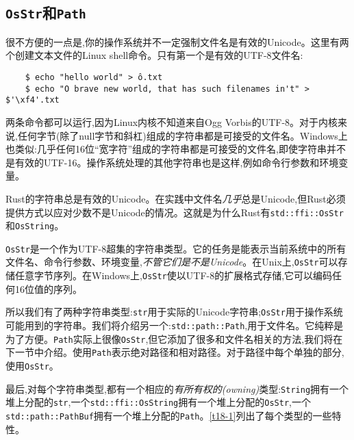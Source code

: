 \subsection{\texttt{OsStr}和\texttt{Path}}
很不方便的一点是,你的操作系统并不一定强制文件名是有效的Unicode。这里有两个创建文本文件的Linux shell命令。只有第一个是有效的UTF-8文件名:
\begin{verbatim}
    $ echo "hello world" > ô.txt
    $ echo "O brave new world, that has such filenames in't" > $'\xf4'.txt
\end{verbatim}

两条命令都可以运行,因为Linux内核不知道来自Ogg Vorbis的UTF-8。对于内核来说,任何字节(除了null字节和斜杠)组成的字符串都是可接受的文件名。Windows上也类似:几乎任何16位“宽字符”组成的字符串都是可接受的文件名,即使字符串并不是有效的UTF-16。操作系统处理的其他字符串也是这样,例如命令行参数和环境变量。

Rust的字符串总是有效的Unicode。在实践中文件名\emph{几乎}总是Unicode,但Rust必须提供方式以应对少数不是Unicode的情况。这就是为什么Rust有\texttt{std::ffi::OsStr}和\texttt{OsString}。

\texttt{OsStr}是一个作为UTF-8超集的字符串类型。它的任务是能表示当前系统中的所有文件名、命令行参数、环境变量,\emph{不管它们是不是Unicode}。在Unix上,\texttt{OsStr}可以存储任意字节序列。在Windows上,\texttt{OsStr}使以UTF-8的扩展格式存储,它可以编码任何16位值的序列。

所以我们有了两种字符串类型:\texttt{str}用于实际的Unicode字符串;\texttt{OsStr}用于操作系统可能用到的字符串。我们将介绍另一个:\texttt{std::path::Path},用于文件名。它纯粹是为了方便。\texttt{Path}实际上很像\texttt{OsStr},但它添加了很多和文件名相关的方法,我们将在下一节中介绍。使用\texttt{Path}表示绝对路径和相对路径。对于路径中每个单独的部分,使用\texttt{OsStr}。

最后,对每个字符串类型,都有一个相应的\emph{有所有权的(owning)}类型:\texttt{String}拥有一个堆上分配的\texttt{str},一个\texttt{std::ffi::OsString}拥有一个堆上分配的\texttt{OsStr},一个\texttt{std::path::PathBuf}拥有一个堆上分配的\texttt{Path}。\autoref{t18-1}列出了每个类型的一些特性。

